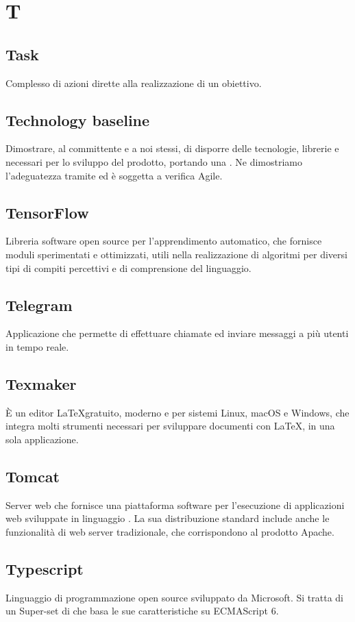 \section*{T}
\markright{}

\subsection*{Task}
Complesso di azioni dirette alla realizzazione di un obiettivo.

\subsection*{Technology baseline}
Dimostrare, al committente e a noi stessi, di disporre delle tecnologie, librerie e  necessari per lo sviluppo del prodotto, portando una . Ne dimostriamo l'adeguatezza tramite  ed è soggetta a verifica Agile.

\subsection*{TensorFlow}
Libreria software open source per l'apprendimento automatico, che fornisce moduli sperimentati e ottimizzati, utili nella realizzazione di algoritmi per diversi tipi di compiti percettivi e di comprensione del linguaggio.

\subsection*{Telegram}
Applicazione  che permette di effettuare chiamate ed inviare messaggi a più utenti in tempo reale.

\subsection*{Texmaker}
È un editor \LaTeX gratuito, moderno e  per sistemi Linux, macOS e Windows, che integra molti strumenti necessari per sviluppare documenti con \LaTeX, in una sola applicazione.

\subsection*{Tomcat}
Server web che fornisce una piattaforma software per l'esecuzione di applicazioni web sviluppate in linguaggio . La sua distribuzione standard include anche le funzionalità di web server tradizionale, che corrispondono al prodotto Apache. 

\subsection*{Typescript}
Linguaggio di programmazione open source sviluppato da Microsoft. Si tratta di un Super-set di  che basa le sue caratteristiche su ECMAScript 6.

